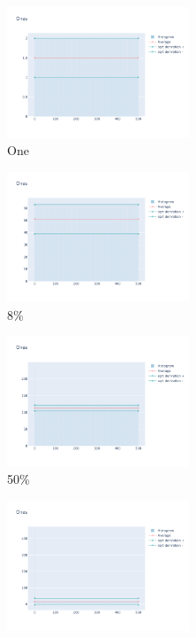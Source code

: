 \documentclass[12pt, fleqn]{report}                             %
\theoremstyle{break}                                            %
\begin{document}
      \begin{figure}[ht!]
        \centering
        \begin{subfigure}[b]{0.4\linewidth}
          \includegraphics[width=0.6\textwidth]{Images/6/dia-a.png}
          \caption{One}
        \end{subfigure}
        \begin{subfigure}[b]{0.4\linewidth}
          \includegraphics[width=0.6\textwidth]{Images/6/dia-b.png}
          \caption{8\%}
        \end{subfigure}
        \begin{subfigure}[b]{0.4\linewidth}
          \includegraphics[width=0.6\textwidth]{Images/6/dia-c.png}
          \caption{50\%}
        \end{subfigure}
        \begin{subfigure}[b]{0.4\linewidth}
          \includegraphics[width=0.6\textwidth]{Images/6/dia-d.png}

\end{subfigure}
\end{figure}
\end{document}
